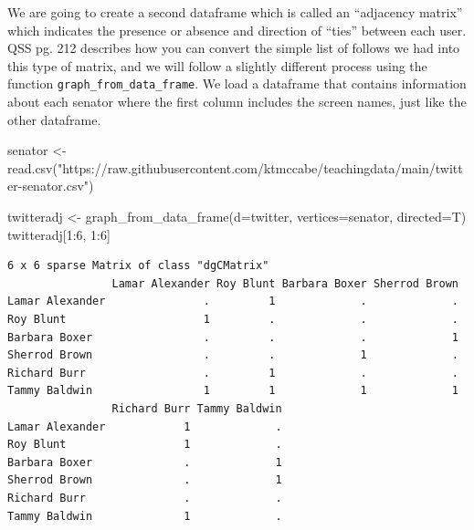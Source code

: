 \documentclass[
  letterpaper,
  DIV=11,
  numbers=noendperiod]{scrreprt}
\newenvironment{Shaded}{\begin{snugshade}}{\end{snugshade}}
\newcommand{\AttributeTok}[1]{\textcolor[rgb]{0.40,0.45,0.13}{#1}}
\newcommand{\DecValTok}[1]{\textcolor[rgb]{0.68,0.00,0.00}{#1}}
\newcommand{\FunctionTok}[1]{\textcolor[rgb]{0.28,0.35,0.67}{#1}}
\newcommand{\NormalTok}[1]{\textcolor[rgb]{0.00,0.23,0.31}{#1}}
\newcommand{\OtherTok}[1]{\textcolor[rgb]{0.00,0.23,0.31}{#1}}
\newcommand{\SpecialCharTok}[1]{\textcolor[rgb]{0.37,0.37,0.37}{#1}}
\newcommand{\StringTok}[1]{\textcolor[rgb]{0.13,0.47,0.30}{#1}}
\begin{document}
We are going to create a second dataframe which is called an ``adjacency
matrix'' which indicates the presence or absence and direction of
``ties'' between each user. QSS pg. 212 describes how you can convert
the simple list of follows we had into this type of matrix, and we will
follow a slightly different process using the function
\texttt{graph\_from\_data\_frame}. We load a dataframe that contains
information about each senator where the first column includes the
screen names, just like the other dataframe.

\begin{Shaded}
\begin{Highlighting}[]
\NormalTok{senator }\OtherTok{\textless{}{-}} \FunctionTok{read.csv}\NormalTok{(}\StringTok{"https://raw.githubusercontent.com/ktmccabe/teachingdata/main/twitter{-}senator.csv"}\NormalTok{)}
\end{Highlighting}
\end{Shaded}

\begin{Shaded}
\begin{Highlighting}[]
\NormalTok{twitteradj }\OtherTok{\textless{}{-}} \FunctionTok{graph\_from\_data\_frame}\NormalTok{(}\AttributeTok{d=}\NormalTok{twitter, }\AttributeTok{vertices=}\NormalTok{senator, }\AttributeTok{directed=}\NormalTok{T) }
\NormalTok{twitteradj[}\DecValTok{1}\SpecialCharTok{:}\DecValTok{6}\NormalTok{, }\DecValTok{1}\SpecialCharTok{:}\DecValTok{6}\NormalTok{]}
\end{Highlighting}
\end{Shaded}

\begin{verbatim}
6 x 6 sparse Matrix of class "dgCMatrix"
                Lamar Alexander Roy Blunt Barbara Boxer Sherrod Brown
Lamar Alexander               .         1             .             .
Roy Blunt                     1         .             .             .
Barbara Boxer                 .         .             .             1
Sherrod Brown                 .         .             1             .
Richard Burr                  .         1             .             .
Tammy Baldwin                 1         1             1             1
                Richard Burr Tammy Baldwin
Lamar Alexander            1             .
Roy Blunt                  1             .
Barbara Boxer              .             1
Sherrod Brown              .             1
Richard Burr               .             .
Tammy Baldwin              1             .
\end{verbatim}
\end{document}
